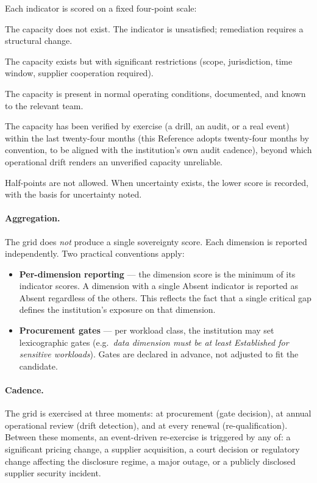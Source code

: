 Each indicator is scored on a fixed four-point scale:

\begin{description}[leftmargin=2.5em,nosep,style=nextline]
  \item[0 --- Absent] The capacity does not exist. The indicator is
  unsatisfied; remediation requires a structural change.
  \item[1 --- Partial] The capacity exists but with significant
  restrictions (scope, jurisdiction, time window, supplier cooperation
  required).
  \item[2 --- Established] The capacity is present in normal operating
  conditions, documented, and known to the relevant team.
  \item[3 --- Robust] The capacity has been verified by exercise (a
  drill, an audit, or a real event) within the last twenty-four
  months (this Reference adopts twenty-four months by convention, to
  be aligned with the institution's own audit cadence), beyond which
  operational drift renders an unverified capacity unreliable.
\end{description}

Half-points are not allowed. When uncertainty exists, the lower score
is recorded, with the basis for uncertainty noted.

\paragraph{Aggregation.} The grid does \emph{not} produce a single
sovereignty score. Each dimension is reported independently. Two
practical conventions apply:

\begin{itemize}[leftmargin=1.5em,nosep]
  \item \textbf{Per-dimension reporting} --- the dimension score is the
    minimum of its indicator scores. A dimension with a single Absent
    indicator is reported as Absent regardless of the others. This
    reflects the fact that a single critical gap defines the
    institution's exposure on that dimension.
  \item \textbf{Procurement gates} --- per workload class, the
    institution may set lexicographic gates (e.g.\ \emph{data dimension
    must be at least Established for sensitive workloads}). Gates are
    declared in advance, not adjusted to fit the candidate.
\end{itemize}

\paragraph{Cadence.} The grid is exercised at three moments: at
procurement (gate decision), at annual operational review (drift
detection), and at every renewal (re-qualification). Between these
moments, an event-driven re-exercise is triggered by any of: a
significant pricing change, a supplier acquisition, a court decision
or regulatory change affecting the disclosure regime, a major outage,
or a publicly disclosed supplier security incident.

